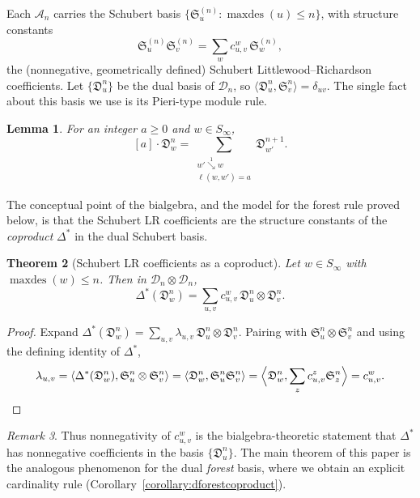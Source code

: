 \documentclass{amsart}
\newtheorem{theorem}{Theorem}[section]
\newtheorem{lemma}[theorem]{Lemma}
\theoremstyle{definition}
\theoremstyle{remark}
\newtheorem{remark}[theorem]{Remark}
\newcommand{\dcoma}{\mathcal{D}}
\newcommand{\coma}{\mathcal{A}}
\newcommand{\dsch}{\mathfrak{D}}
\newcommand{\maxd}{\operatorname{maxdes}}
\newcommand{\sch}{\mathfrak{S}}
\newcommand{\downvar}[1]{\stackrel{#1}{\searrow}}
\begin{document}
Each $\coma_n$ carries the Schubert basis $\{\sch_u^{(n)}:\maxd(u)\leq n\}$, with structure constants
\[
\sch_u^{(n)}\sch_v^{(n)}=\sum_w c_{u,v}^w\,\sch_w^{(n)},
\]
the (nonnegative, geometrically defined) Schubert Littlewood--Richardson coefficients. Let $\{\dsch_u^n\}$ be the dual basis of $\dcoma_n$, so $\langle\dsch_u^n,\sch_v^n\rangle=\delta_{uv}$. The single fact about this basis we use is its Pieri-type module rule.

\begin{lemma}\label{lemma:dpieri}
For an integer $a\geq 0$ and $w\in S_\infty$,
\[
[a]\cdot\dsch_w^n=\sum_{\substack{w'\downvar{1}w\\\ell(w,w')=a}}\dsch_{w'}^{n+1}.
\]
\end{lemma}

The conceptual point of the bialgebra, and the model for the forest rule proved below, is that the Schubert LR coefficients are the structure constants of the \emph{coproduct} $\Delta^*$ in the dual Schubert basis.

\begin{theorem}[Schubert LR coefficients as a coproduct]\label{theorem:dschcoproduct}
Let $w\in S_\infty$ with $\maxd(w)\leq n$. Then in $\dcoma_n\otimes\dcoma_n$,
\[
\Delta^*(\dsch_w^n)=\sum_{u,v}c_{u,v}^w\,\dsch_u^n\otimes\dsch_v^n.
\]
\end{theorem}
\begin{proof}
Expand $\Delta^*(\dsch_w^n)=\sum_{u,v}\lambda_{u,v}\,\dsch_u^n\otimes\dsch_v^n$. Pairing with $\sch_u^n\otimes\sch_v^n$ and using the defining identity of $\Delta^*$,
\[
\lambda_{u,v}=\langle\Delta^*(\dsch_w^n),\sch_u^n\otimes\sch_v^n\rangle=\langle\dsch_w^n,\sch_u^n\sch_v^n\rangle=\Big\langle\dsch_w^n,\sum_z c_{u,v}^z\sch_z^n\Big\rangle=c_{u,v}^w.\qedhere
\]
\end{proof}

\begin{remark}
Thus nonnegativity of $c_{u,v}^w$ is the bialgebra-theoretic statement that $\Delta^*$ has nonnegative coefficients in the basis $\{\dsch_u^n\}$. The main theorem of this paper is the analogous phenomenon for the dual \emph{forest} basis, where we obtain an explicit cardinality rule (Corollary~\ref{corollary:dforestcoproduct}).
\end{remark}
\end{document}
